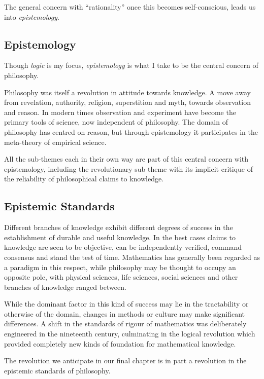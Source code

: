 The general concern with ``rationality'' once this becomes self-conscious, leads us into {\it epistemology}.

\subsection{Epistemology}


Though {\it logic} is my focus, {\it epistemology} is what I take to be the central concern of philosophy.

Philosophy was itself a revolution in attitude towards knowledge.
A move away from revelation, authority, religion, superstition and myth, towards observation and reason.
In modern times observation and experiment have become the primary tools of science, now independent of philosophy.
The domain of philosophy has centred on reason, but through epistemology it participates in the meta-theory of empirical science.

All the sub-themes each in their own way are part of this central concern with epistemology, including the revolutionary sub-theme with its implicit critique of the reliability of philosophical claims to knowledge.

\subsection{Epistemic Standards}

Different branches of knowledge exhibit different degrees of success in the establishment of durable and useful knowledge.
In the best cases claims to knowledge are seen to be objective, can be independently verified, command consensus and stand the test of time.
Mathematics has generally been regarded as a paradigm in this respect, while philosophy may be thought to occupy an opposite pole, with physical sciences, life sciences, social sciences and other branches of knowledge ranged between.

While the dominant factor in this kind of success may lie in the tractability or otherwise of the domain, changes in methods or culture may make significant differences.
A shift in the standards of rigour of mathematics was deliberately engineered in the nineteenth century, culminating in the logical revolution which provided completely new kinds of foundation for mathematical knowledge.

The revolution we anticipate in our final chapter is in part a revolution in the epistemic standards of philosophy.

